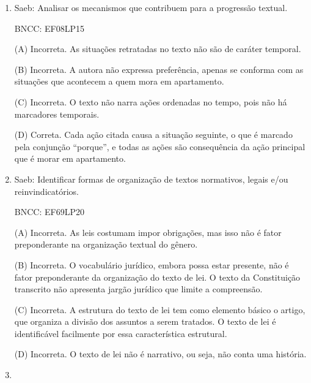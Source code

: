 \begin{enumerate}
(C) Incorreta. A língua do cotidiano é governada por regras tanto quanto
a língua ensinada na escola, porém são regras diferentes baseadas em
critérios diferentes, às vezes não conscientes, como no caso da língua
cotidiana.

(D) Correta. O autor diferencia as regras linguísticas ensinadas na
escola (norma-padrão) do uso real do português. Segundo ele, as pessoas
não fazem essa distinção e acabam afirmando levianamente que o português
é difícil, porque reduzem a língua, em todos os seus usos, àquela
modalidade ensinada na escola.


\item

Saeb: Analisar os mecanismos que contribuem para a progressão textual.

BNCC: EF08LP15

(A) Incorreta. As situações retratadas no texto não são de caráter
temporal.

(B) Incorreta. A autora não expressa preferência, apenas se conforma com
as situações que acontecem a quem mora em apartamento.

(C) Incorreta. O texto não narra ações ordenadas no tempo, pois não há
marcadores temporais.

(D) Correta. Cada ação citada causa a situação seguinte, o que é marcado
pela conjunção ``porque'', e todas as ações são consequência da ação
principal que é morar em apartamento.


\item

Saeb: Identificar formas de organização de textos normativos, legais
e/ou reinvindicatórios.

BNCC: EF69LP20

(A) Incorreta. As leis costumam impor obrigações, mas isso não é fator
preponderante na organização textual do gênero.

(B) Incorreta. O vocabulário jurídico, embora possa estar presente, não
é fator preponderante da organização do texto de lei. O texto da
Constituição transcrito não apresenta jargão jurídico que limite a
compreensão.

(C) Incorreta. A estrutura do texto de lei tem como elemento básico o
artigo, que organiza a divisão dos assuntos a serem tratados. O texto de
lei é identificável facilmente por essa característica estrutural.

(D) Incorreta. O texto de lei não é narrativo, ou seja, não conta uma
história.

\item


\end{enumerate}
